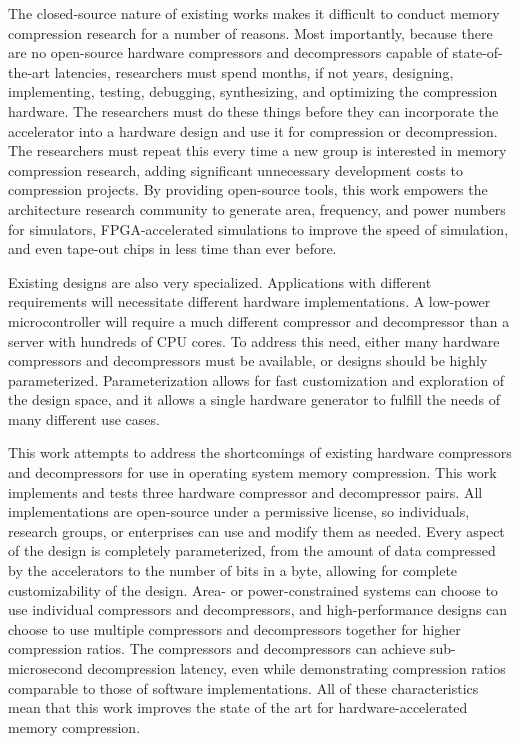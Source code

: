 \documentclass[doublespace,nopageskip]{VTthesis}
\begin{document}
The closed-source nature of existing works makes it difficult to conduct memory compression research for a number of reasons. Most importantly, because there are no open-source hardware compressors and decompressors capable of state-of-the-art latencies, researchers must spend months, if not years, designing, implementing, testing, debugging, synthesizing, and optimizing the compression hardware. The researchers must do these things before they can incorporate the accelerator into a hardware design and use it for compression or decompression. The researchers must repeat this every time a new group is interested in memory compression research, adding significant unnecessary development costs to compression projects. By providing open-source tools, this work empowers the architecture research community to generate area, frequency, and power numbers for simulators, FPGA-accelerated simulations to improve the speed of simulation, and even tape-out chips in less time than ever before.

Existing designs are also very specialized. Applications with different requirements will necessitate different hardware implementations. A low-power microcontroller will require a much different compressor and decompressor than a server with hundreds of CPU cores. To address this need, either many hardware compressors and decompressors must be available, or designs should be highly parameterized. Parameterization allows for fast customization and exploration of the design space, and it allows a single hardware generator to fulfill the needs of many different use cases.

This work attempts to address the shortcomings of existing hardware compressors and decompressors for use in operating system memory compression. This work implements and tests three hardware compressor and decompressor pairs. All implementations are open-source under a permissive license, so individuals, research groups, or enterprises can use and modify them as needed. Every aspect of the design is completely parameterized, from the amount of data compressed by the accelerators to the number of bits in a byte, allowing for complete customizability of the design. Area- or power-constrained systems can choose to use individual compressors and decompressors, and high-performance designs can choose to use multiple compressors and decompressors together for higher compression ratios. The compressors and decompressors can achieve sub-microsecond decompression latency, even while demonstrating compression ratios comparable to those of software implementations. All of these characteristics mean that this work improves the state of the art for hardware-accelerated memory compression.
\end{document}
